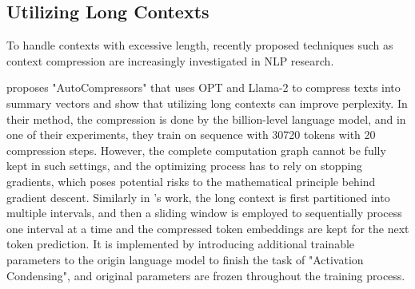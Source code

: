 \subsection{Utilizing Long Contexts}

To handle contexts with excessive length, recently proposed techniques such as context compression are increasingly investigated in NLP research. 

\citet{chevalier2023adapting} proposes "AutoCompressors" that uses OPT \cite{zhang2022opt} and Llama-2 \cite{touvron2023llama} to compress texts into summary vectors and show that utilizing long contexts can improve perplexity. In their method, the compression is done by the billion-level language model, and in one of their experiments, they train on sequence with 30720 tokens with 20 compression steps. However, the complete computation graph cannot be fully kept in such settings, and the optimizing process has to rely on stopping gradients, which poses potential risks to the mathematical principle behind gradient descent. Similarly in \citet{zhang2024soaring}'s work, the long context is first partitioned into multiple intervals, and then a sliding window is employed to sequentially process one interval at a time and the compressed token embeddings are kept for the next token prediction. It is implemented by introducing additional trainable parameters to the origin language model to finish the task of "Activation Condensing", and original parameters are frozen throughout the training process.



\fi